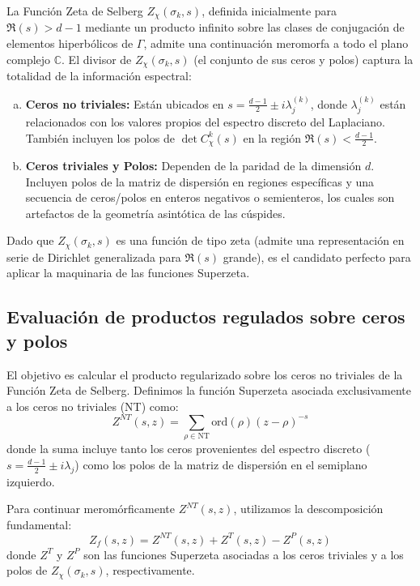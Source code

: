 La Función Zeta de Selberg $Z_\chi(\sigma_k, s)$, definida inicialmente para $\Re(s) > d-1$ mediante un producto infinito sobre las clases de conjugación de elementos hiperbólicos de $\Gamma$, admite una continuación meromorfa a todo el plano complejo $\mathbb{C}$. El divisor de $Z_\chi(\sigma_k, s)$ (el conjunto de sus ceros y polos) captura la totalidad de la información espectral:

\begin{enumerate}[a)]
    \item \textbf{Ceros no triviales:} Están ubicados en $s = \frac{d-1}{2} \pm i\lambda_j^{(k)}$, donde $\lambda_j^{(k)}$ están relacionados con los valores propios del espectro discreto del Laplaciano. También incluyen los polos de $\det C_\chi^k(s)$ en la región $\Re(s) < \frac{d-1}{2}$.
    \item \textbf{Ceros triviales y Polos:} Dependen de la paridad de la dimensión $d$. Incluyen polos de la matriz de dispersión en regiones específicas y una secuencia de ceros/polos en enteros negativos o semienteros, los cuales son artefactos de la geometría asintótica de las cúspides.
\end{enumerate}

Dado que $Z_\chi(\sigma_k, s)$ es una función de tipo zeta (admite una representación en serie de Dirichlet generalizada para $\Re(s)$ grande), es el candidato perfecto para aplicar la maquinaria de las funciones Superzeta.

\subsection{Evaluación de productos regulados sobre ceros y polos}

El objetivo es calcular el producto regularizado sobre los ceros no triviales de la Función Zeta de Selberg. Definimos la función Superzeta asociada exclusivamente a los ceros no triviales (NT) como:
$$ Z^{NT}(s, z) = \sum_{\rho \in \text{NT}} \text{ord}(\rho) (z - \rho)^{-s} $$
donde la suma incluye tanto los ceros provenientes del espectro discreto ($s = \frac{d-1}{2} \pm i\lambda_j$) como los polos de la matriz de dispersión en el semiplano izquierdo.

Para continuar meromórficamente $Z^{NT}(s, z)$, utilizamos la descomposición fundamental:
$$ Z_f(s, z) = Z^{NT}(s, z) + Z^T(s, z) - Z^P(s, z) $$
donde $Z^T$ y $Z^P$ son las funciones Superzeta asociadas a los ceros triviales y a los polos de $Z_\chi(\sigma_k, s)$, respectivamente. 

